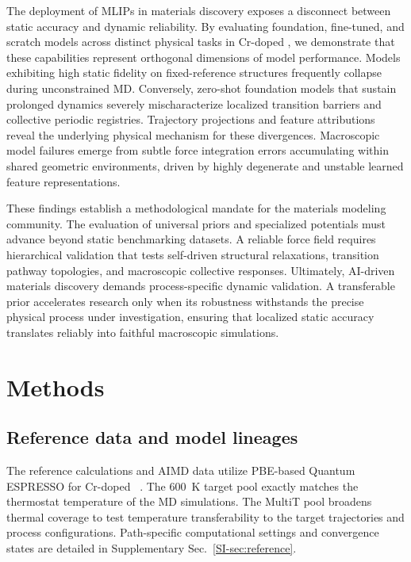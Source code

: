 \documentclass[pdflatex,sn-mathphys-num]{sn-jnl}
\begin{document}
The deployment of MLIPs in materials discovery exposes a disconnect between static accuracy and dynamic reliability. By evaluating foundation, fine-tuned, and scratch models across distinct physical tasks in Cr-doped , we demonstrate that these capabilities represent orthogonal dimensions of model performance. Models exhibiting high static fidelity on fixed-reference structures frequently collapse during unconstrained MD. Conversely, zero-shot foundation models that sustain prolonged dynamics severely mischaracterize localized transition barriers and collective periodic registries. Trajectory projections and feature attributions reveal the underlying physical mechanism for these divergences. Macroscopic model failures emerge from subtle force integration errors accumulating within shared geometric environments, driven by highly degenerate and unstable learned feature representations.

These findings establish a methodological mandate for the materials modeling community. The evaluation of universal priors and specialized potentials must advance beyond static benchmarking datasets. A reliable force field requires hierarchical validation that tests self-driven structural relaxations, transition pathway topologies, and macroscopic collective responses. Ultimately, AI-driven materials discovery demands process-specific dynamic validation. A transferable prior accelerates research only when its robustness withstands the precise physical process under investigation, ensuring that localized static accuracy translates reliably into faithful macroscopic simulations.

\section{Methods}\label{sec:methods}
\subsection{Reference data and model lineages}\label{sec:models}
The reference calculations and AIMD data utilize PBE-based Quantum ESPRESSO for Cr-doped ~\citep{giannozzi2009quantum,kohn_self-consistent_1965,perdew1996generalized}. The 600~K target pool exactly matches the thermostat temperature of the MD simulations. The MultiT pool broadens thermal coverage to test temperature transferability to the target trajectories and process configurations. Path-specific computational settings and convergence states are detailed in Supplementary Sec.~\ref{SI-sec:reference}.
\end{document}
